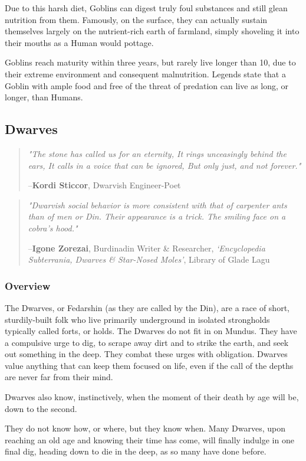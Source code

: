 \documentclass[oneside,11pt,english]{book}
\begin{document}
 
Due to this harsh diet, Goblins can digest truly foul substances and still glean nutrition from them. 
Famously, on the surface, they can actually sustain themselves largely on the nutrient-rich earth of 
farmland, simply shoveling it into their mouths as a Human would pottage. 
 

Goblins reach maturity within three years, but rarely live longer than 10, due to their extreme 
environment and consequent malnutrition. Legends state that a Goblin with ample food and free of the 
threat of predation can live as long, or longer, than Humans. 
\subsection{Dwarves}\label{sec:dwarves}
\begin{quotation}
	\emph{"The stone has called us for an eternity,	It rings unceasingly behind the ears, 	It calls in a voice that can be ignored, 	But only just, and not forever."}

	\hfill--\textbf{Kordi Sticcor}, Dwarvish Engineer-Poet 
\end{quotation}
\begin{quotation}
	\emph{"Dwarvish social behavior is more consistent with that of carpenter ants than of men or Din. Their appearance is a trick. The smiling face on a cobra's hood."}

	\hfill--\textbf{Igone Zorezai}, Burdinadin Writer \& Researcher, \textit{‘Encyclopedia Subterrania, Dwarves \& Star-Nosed Moles’}, Library of Glade Lagu 
\end{quotation}
\subsubsection*{Overview} 
The Dwarves, or Fedarshin (as they are called by the Din), are a race of short, sturdily-built folk who live 
primarily underground in isolated strongholds typically called forts, or holds. The Dwarves do not fit in 
on Mundus. They have a compulsive urge to dig, to scrape away dirt and to strike the earth, and seek out 
something in the deep. They combat these urges with obligation. Dwarves value anything that can keep 
them focused on life, even if the call of the depths are never far from their mind. 

 
Dwarves also know, instinctively, when the moment of their death by age will be, down to the second. 


They do not know how, or where, but they know when. Many Dwarves, upon reaching an old age and 
knowing their time has come, will finally indulge in one final dig, heading down to die in the deep, as so 
many have done before. 
\end{document}
